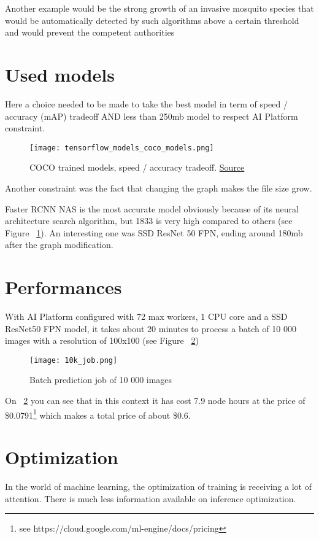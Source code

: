Another example would be the strong growth of an invasive mosquito species that would be automatically detected by such algorithms above a certain threshold and would prevent the competent authorities


\pagebreak\section{Used models}

Here a choice needed to be made to take the best model in term of speed / accuracy (mAP) tradeoff AND less than 250mb model to respect AI Platform constraint.

\begin{figure}[H]
    \centering
    \texttt{[image: tensorflow\_models\_coco\_models.png]}
	\caption{COCO trained models, speed / accuracy tradeoff. \href{https://github.com/tensorflow/models/blob/master/research/object_detection/g3doc/detection_model_zoo.md}{Source}}
	\label{fig:tfmodels}
\end{figure}

Another constraint was the fact that changing the graph makes the file size grow.

Faster RCNN NAS is the most accurate model obviously because of its neural architecture search algorithm, but 1833 is very high compared to others (see Figure ~\ref{fig:tfmodels}).
An interesting one was SSD ResNet 50 FPN, ending around 180mb after the graph modification.

\pagebreak\section{Performances}

With AI Platform configured with 72 max workers, 1 CPU core and a SSD ResNet50 FPN model, it takes about 20 minutes to process a batch of 10 000 images with a resolution of 100x100 (see Figure ~\ref{fig:10kjob})

\begin{figure}[H]
    \centering
    \texttt{[image: 10k\_job.png]}
	\caption{Batch prediction job of 10 000 images}
	\label{fig:10kjob}
\end{figure}

On 	~\ref{fig:10kjob} you can see that in this context it has cost 7.9 node hours at the price of \$0.0791\footnote{see https://cloud.google.com/ml-engine/docs/pricing} which makes a total price of about \$0.6.

\pagebreak\section{Optimization}
In the world of machine learning, the optimization of training is receiving a lot of attention. There is much less information available on inference optimization. 

